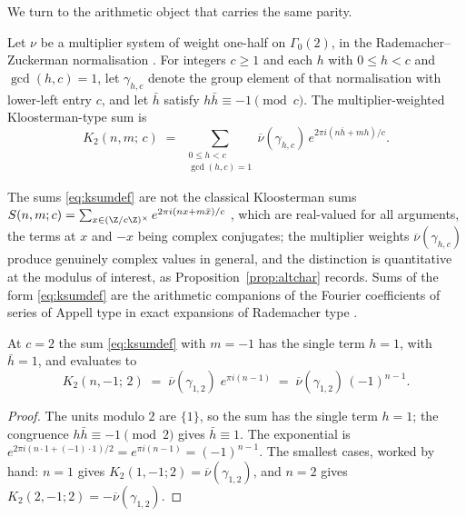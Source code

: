 We turn to the arithmetic object that carries the same parity.

\begin{definition}\label{def:ksum}
Let $\nu$ be a multiplier system of weight one-half on
$\Gamma_0(2)$, in the Rademacher--Zuckerman normalisation
\cite{RademacherZuckerman}. For integers $c \ge 1$ and each $h$ with
$0 \le h < c$ and $\gcd(h,c) = 1$, let $\gamma_{h,c}$ denote the
group element of that normalisation with lower-left entry $c$, and
let $\bar h$ satisfy $h\bar h \equiv -1 \pmod c$. The
multiplier-weighted Kloosterman-type sum is
\begin{equation}\label{eq:ksumdef}
K_2(n, m;\, c) \;=\;
\sum_{\substack{0 \le h < c \\ \gcd(h,c)=1}}
\overline{\nu}(\gamma_{h,c})\,
e^{2\pi i (n \bar h + m h)/c} .
\end{equation}
\end{definition}

The sums \eqref{eq:ksumdef} are not the classical Kloosterman sums
$S(n,m;c) = \sum_{x \in (\Z/c\Z)^{\times}} e^{2\pi i (nx + m\bar
x)/c}$ \cite{Kloosterman}, which are real-valued for all arguments,
the terms at $x$ and $-x$ being complex conjugates; the multiplier
weights $\overline{\nu}(\gamma_{h,c})$ produce genuinely complex
values in general, and the distinction is quantitative at the
modulus of interest, as Proposition~\ref{prop:altchar} records.
Sums of the form \eqref{eq:ksumdef} are the arithmetic companions of
the Fourier coefficients of series of Appell type in exact
expansions of Rademacher type \cite{RademacherZuckerman,
BringmannOno}.

\begin{lemma}\label{lem:ksumtwo}
At $c = 2$ the sum \eqref{eq:ksumdef} with $m = -1$ has the single
term $h = 1$, with $\bar h = 1$, and evaluates to
\begin{equation}\label{eq:ksumtwo}
K_2(n, -1;\, 2) \;=\;
\overline{\nu}(\gamma_{1,2})\; e^{\pi i (n-1)} \;=\;
\overline{\nu}(\gamma_{1,2})\,(-1)^{n-1} .
\end{equation}
\end{lemma}

\begin{proof}
The units modulo $2$ are $\{1\}$, so the sum has the single term
$h = 1$; the congruence $h\bar h \equiv -1 \pmod 2$ gives
$\bar h \equiv 1$. The exponential is
$e^{2\pi i (n \cdot 1 + (-1) \cdot 1)/2} = e^{\pi i (n-1)} =
(-1)^{n-1}$. The smallest cases, worked by hand: $n = 1$ gives
$K_2(1,-1;2) = \overline{\nu}(\gamma_{1,2})$, and $n = 2$ gives
$K_2(2,-1;2) = -\overline{\nu}(\gamma_{1,2})$.
\end{proof}

